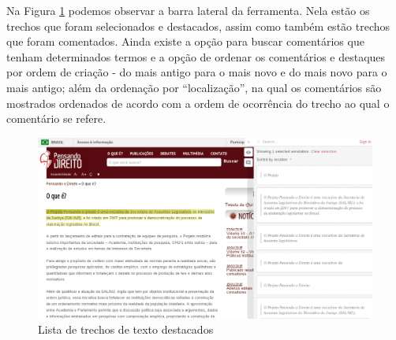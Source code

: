 Na Figura \ref{fig:hypotesis-trechos-destacados} podemos observar a barra lateral da ferramenta. Nela estão os trechos que foram selecionados e destacados, assim como também estão trechos que foram comentados. Ainda existe a opção para buscar comentários que tenham determinados termos e a opção de ordenar os comentários e destaques por ordem de criação - do mais antigo para o mais novo e do mais novo para o mais antigo; além da ordenação por ``localização'', na qual os comentários são mostrados ordenados de acordo com a ordem de ocorrência do trecho ao qual o comentário se refere. 
\begin{landscape}
    \begin{figure}[htb]%
        \begin{center}
            \includegraphics[scale=0.55]{./imagens/hypotesis-trechos-destacados.png}%
        \end{center}%
        \caption{Lista de trechos de texto destacados\label{fig:hypotesis-trechos-destacados}}%
    \end{figure}%
\end{landscape}
